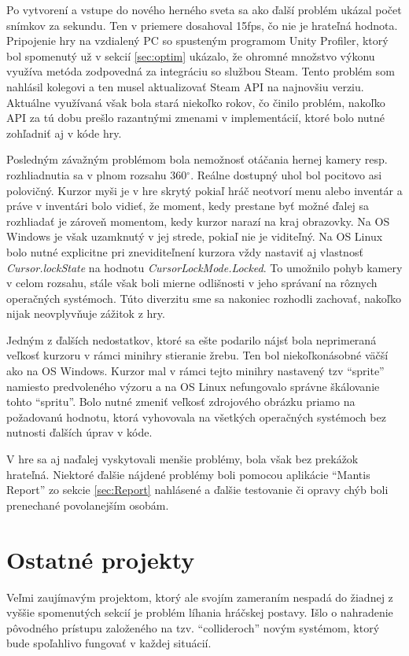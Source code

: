 \documentclass[slovak, bachelorpractice]{diploma}
\begin{document}
Po vytvorení a vstupe do nového herného sveta sa ako ďalší problém ukázal počet snímkov za sekundu. Ten v priemere dosahoval 15fps, čo nie je hrateľná hodnota. Pripojenie hry na vzdialený PC so spusteným programom Unity Profiler, ktorý bol spomenutý už v sekcií \ref{sec:optim} ukázalo, že ohromné množstvo výkonu využíva metóda zodpovedná za integráciu so službou Steam. Tento problém som nahlásil kolegovi a ten musel aktualizovať Steam API na najnovšiu verziu. Aktuálne využívaná však bola stará niekoľko rokov, čo činilo problém, nakoľko API za tú dobu prešlo razantnými zmenami v implementácií, ktoré bolo nutné zohľadniť aj v kóde hry.

Posledným závažným problémom bola nemožnosť otáčania hernej kamery resp. rozhliadnutia sa v plnom rozsahu 360$^{\circ}$. Reálne dostupný uhol bol pocitovo asi polovičný. Kurzor myši je v hre skrytý pokiaľ hráč neotvorí menu alebo inventár a práve v inventári bolo vidieť, že moment, kedy prestane byť možné ďalej sa rozhliadať je zároveň momentom, kedy kurzor narazí na kraj obrazovky. Na OS Windows je však uzamknutý v jej strede, pokiaľ nie je viditeľný. Na OS Linux bolo nutné explicitne pri zneviditeľnení kurzora vždy nastaviť aj vlastnosť \textit{Cursor.lockState} na hodnotu \textit{CursorLockMode.Locked}. To umožnilo pohyb kamery v celom rozsahu, stále však boli mierne odlišnosti v jeho správaní na rôznych operačných systémoch. Túto diverzitu sme sa nakoniec rozhodli zachovať, nakoľko nijak neovplyvňuje zážitok z hry.

Jedným z ďalších nedostatkov, ktoré sa ešte podarilo nájsť bola neprimeraná veľkosť kurzoru v rámci minihry stieranie žrebu. Ten bol niekoľkonásobné väčší ako na OS Windows. Kurzor mal v rámci tejto minihry nastavený tzv \enquote{sprite} namiesto predvoleného výzoru a na OS Linux nefungovalo správne škálovanie tohto \enquote{spritu}. Bolo nutné zmeniť veľkosť zdrojového obrázku priamo na požadovanú hodnotu, ktorá vyhovovala na všetkých operačných systémoch bez nutnosti ďalších úprav v kóde.

V hre sa aj naďalej vyskytovali menšie problémy, bola však bez prekážok hrateľná. Niektoré ďalšie nájdené problémy boli pomocou aplikácie \enquote{Mantis Report} zo sekcie \ref{sec:Report} nahlásené a ďalšie testovanie či opravy chýb boli prenechané povolanejším osobám.

\section{Ostatné projekty}
\label{sec:Others}
Veľmi zaujímavým projektom, ktorý ale svojím zameraním nespadá do žiadnej z vyššie spomenutých sekcií je problém líhania hráčskej postavy. Išlo o nahradenie pôvodného prístupu založeného na tzv. \enquote{collideroch} novým systémom, ktorý bude spoľahlivo fungovať v každej situácií.
\end{document}
